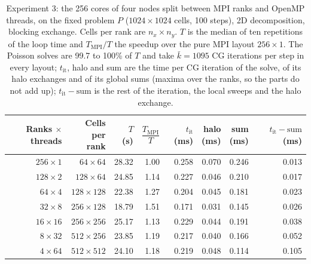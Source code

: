 \begin{table}[htbp]
\centering
\small
\begin{tabular}{rrrrrrrr}
\toprule
\shortstack[r]{Ranks $\times$\\threads} & \shortstack[r]{Cells\\per rank} & \shortstack[r]{$T$\\(s)} & $\dfrac{T_{\mathrm{MPI}}}{T}$ & \shortstack[r]{$t_{\mathrm{it}}$\\(ms)} & \shortstack[r]{halo\\(ms)} & \shortstack[r]{sum\\(ms)} & \shortstack[r]{$t_{\mathrm{it}}-\mathrm{sum}$\\(ms)} \\
\midrule
$256\times1$ & $64\times64$ & 28.32 & 1.00 & 0.258 & 0.070 & 0.246 & 0.013 \\
$128\times2$ & $128\times64$ & 24.85 & 1.14 & 0.227 & 0.046 & 0.210 & 0.017 \\
$64\times4$ & $128\times128$ & 22.38 & 1.27 & 0.204 & 0.045 & 0.181 & 0.023 \\
$32\times8$ & $256\times128$ & 18.79 & 1.51 & 0.171 & 0.031 & 0.145 & 0.026 \\
$16\times16$ & $256\times256$ & 25.17 & 1.13 & 0.229 & 0.044 & 0.191 & 0.038 \\
$8\times32$ & $512\times256$ & 23.85 & 1.19 & 0.217 & 0.040 & 0.166 & 0.052 \\
$4\times64$ & $512\times512$ & 24.10 & 1.18 & 0.219 & 0.048 & 0.114 & 0.105 \\
\bottomrule
\end{tabular}
\caption{Experiment 3: the 256 cores of four nodes split between MPI ranks and OpenMP threads, on the fixed problem $P$ ($1024\times1024$ cells, 100 steps), 2D decomposition, blocking exchange. Cells per rank are $n_x\times n_y$. $T$ is the median of ten repetitions of the loop time and $T_{\mathrm{MPI}}/T$ the speedup over the pure MPI layout $256\times1$. The Poisson solves are 99.7 to 100\% of $T$ and take $\bar k=1095$ CG iterations per step in every layout; $t_{\mathrm{it}}$, halo and sum are the time per CG iteration of the solve, of its halo exchanges and of its global sums (maxima over the ranks, so the parts do not add up); $t_{\mathrm{it}}-\mathrm{sum}$ is the rest of the iteration, the local sweeps and the halo exchange.}
\label{tab:hybrid-layouts}
\end{table}
